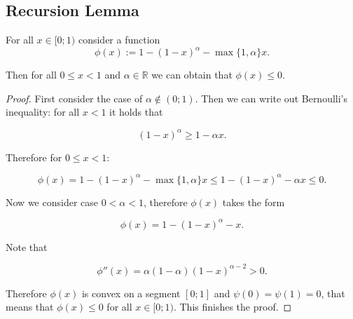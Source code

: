     \subsection{Recursion Lemma}
    \begin{lemma}
    \label{lem:baskirskaya_lemma}
        For all $x \in [0; 1)$ consider a function 
        $$\phi(x) := 1 - (1 - x)^{\alpha} - \max\{1, \alpha\} x.$$
        
        Then for all $0 \leq x < 1$ and $\alpha \in \mathbb{R}$ we can obtain that  $\phi(x) \leq 0$.
    \end{lemma}
    \begin{proof}
        First consider the case of $\alpha \notin (0; 1)$. Then we can write out Bernoulli's inequality: for all  $x < 1$ it holds that

        \begin{equation*}
            (1 - x)^{\alpha} \geq 1 - \alpha x.
        \end{equation*}

        Therefore for $0 \leq x < 1$:

        \begin{equation*}
            \phi(x) = 1 - (1 - x)^{\alpha} - \max\{1, \alpha\} x \leq 1 - (1 - x)^{\alpha} - \alpha x \leq 0.
        \end{equation*}

        Now we consider case $0 < \alpha < 1$, therefore $\phi(x)$ takes the form

        \begin{equation*}
            \phi(x) = 1 - (1 - x)^{\alpha} -  x.
        \end{equation*}

        Note that

        \begin{equation*}
            \phi''(x) = \alpha(1 - \alpha)(1 - x)^{\alpha-2} > 0.
        \end{equation*}

        Therefore $\phi(x)$ is convex on a segment $[0; 1]$ and $\psi(0) = \psi(1) = 0$, that means that $\phi(x) \leq 0$ for all $x \in [0; 1)$. This finishes the proof.
    \end{proof}

